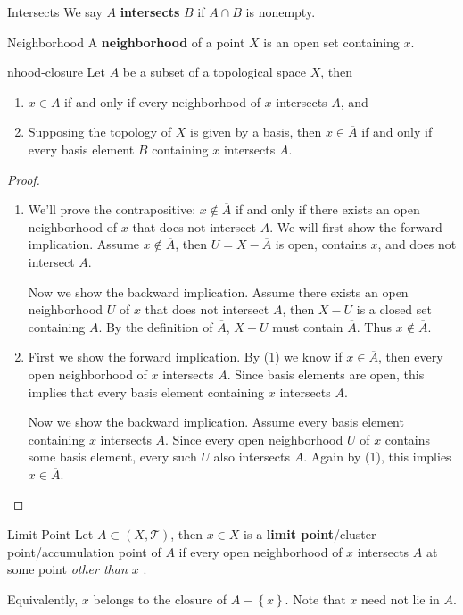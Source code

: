\documentclass[10pt]{report}
\begin{document}
\begin{defn}{Intersects}{}
We say $A$ \textbf{intersects} $B$ if $A \cap B$ is nonempty.
\end{defn}

\begin{defn}{Neighborhood}{}
A \textbf{neighborhood} of a point $X$ is an open set containing $x$.
\end{defn}

\begin{thrm}{}{nhood-closure}
Let $A$ be a subset of a topological space $X$, then
\begin{enumerate}
	\item $x \in \overline{A}$ if and only if every neighborhood of $x$ intersects $A$, and
	\item Supposing the topology of $X$ is given by a basis, then $x \in \overline{A}$ if and only if every basis element $B$ containing $x$ intersects $A$.
\end{enumerate}
\end{thrm}
\begin{proof}
	\begin{enumerate}
		\item We'll prove the contrapositive: $x \not\in \overline{A}$ if and only if there exists an open neighborhood of $x$ that does not intersect $A$. We will first show the forward implication. Assume $x \not\in \overline{A}$, then $U = X-\overline{A}$ is open, contains $x$, and does not intersect $A$.

			Now we show the backward implication. Assume there exists an open neighborhood $U$ of $x$ that does not intersect $A$, then $X-U$ is a closed set containing $A$. By the definition of $\overline{A}$, $X-U$ must contain $\overline{A}$. Thus $x \not\in \overline{A}$.

		\item First we show the forward implication. By (1) we know if $x \in  \overline{A}$, then every open neighborhood of $x$ intersects $A$. Since basis elements are open, this implies that every basis element containing $x$ intersects $A$.

			Now we show the backward implication. Assume every basis element containing $x$ intersects $A$. Since every open neighborhood $U$ of $x$ contains some basis element, every such $U$ also intersects $A$. Again by (1), this implies $x \in \overline{A}$.
	\end{enumerate}
\end{proof}

\begin{defn}{Limit Point}{}
	Let $A \subset (X,\mathcal{T})$, then $x \in X$ is a \textbf{limit point}/cluster point/accumulation point of $A$ if every open neighborhood of $x$ intersects $A$ at some point \textit{other than $x$ }.

	Equivalently, $x$ belongs to the closure of $A - \left\{ x \right\}$. Note that $x$ need not lie in $A$.
\end{defn}
\end{document}
